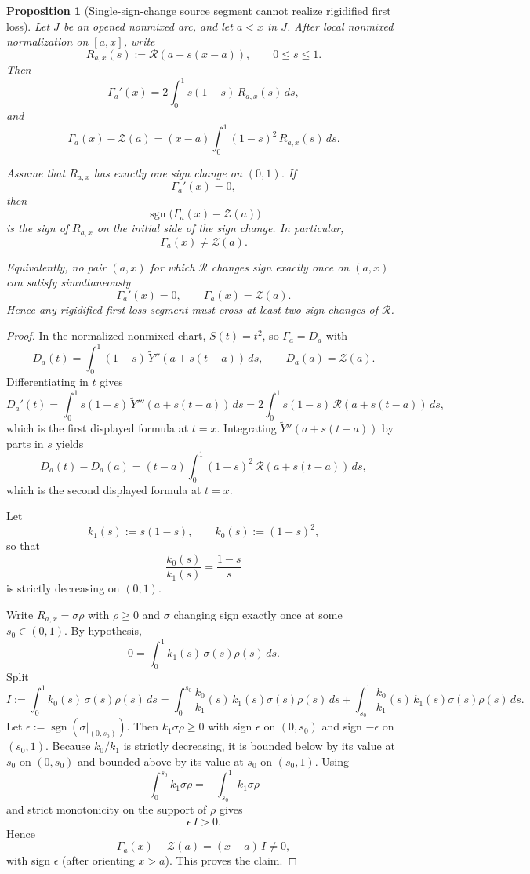 \documentclass[11pt,a4paper]{amsart}
\theoremstyle{plain}
\newtheorem{proposition}[theorem]{Proposition}
\theoremstyle{definition}
\begin{document}
\begin{proposition}[Single-sign-change source segment cannot realize rigidified first loss]
\label{prop:single-sign-change-cannot-realize-first-loss}
Let $J$ be an opened nonmixed arc, and let $a<x$ in $J$.
After local nonmixed normalization on $[a,x]$, write
\[
R_{a,x}(s):=\mathcal R(a+s(x-a)),
\qquad 0\le s\le 1.
\]
Then
\[
\Gamma_a'(x)
=
2\int_0^1 s(1-s)\,R_{a,x}(s)\,ds,
\]
and
\[
\Gamma_a(x)-\mathcal Z(a)
=
(x-a)\int_0^1 (1-s)^2\,R_{a,x}(s)\,ds.
\]

Assume that $R_{a,x}$ has exactly one sign change on $(0,1)$.
If
\[
\Gamma_a'(x)=0,
\]
then
\[
\operatorname{sgn}\bigl(\Gamma_a(x)-\mathcal Z(a)\bigr)
\]
is the sign of $R_{a,x}$ on the initial side of the sign change.
In particular,
\[
\Gamma_a(x)\neq \mathcal Z(a).
\]

Equivalently, no pair $(a,x)$ for which $\mathcal R$ changes sign exactly once
on $(a,x)$ can satisfy simultaneously
\[
\Gamma_a'(x)=0,
\qquad
\Gamma_a(x)=\mathcal Z(a).
\]
Hence any rigidified first-loss segment must cross at least two sign changes of
$\mathcal R$.
\end{proposition}

\begin{proof}
In the normalized nonmixed chart, $S(t)=t^2$, so
$\Gamma_a = D_a$ with
\[
D_a(t)=\int_0^1 (1-s)\,\widetilde Y''(a+s(t-a))\,ds,
\qquad
D_a(a)=\mathcal Z(a).
\]
Differentiating in $t$ gives
\[
D_a'(t)=\int_0^1 s(1-s)\,\widetilde Y'''(a+s(t-a))\,ds
=2\int_0^1 s(1-s)\,\mathcal R(a+s(t-a))\,ds,
\]
which is the first displayed formula at $t=x$. Integrating
$\widetilde Y''(a+s(t-a))$ by parts in $s$ yields
\[
D_a(t)-D_a(a)
=
(t-a)\int_0^1 (1-s)^2\,\mathcal R(a+s(t-a))\,ds,
\]
which is the second displayed formula at $t=x$.

Let
\[
k_1(s):=s(1-s),\qquad k_0(s):=(1-s)^2,
\]
so that
\[
\frac{k_0(s)}{k_1(s)}=\frac{1-s}{s}
\]
is strictly decreasing on $(0,1)$.

Write $R_{a,x}=\sigma\rho$ with $\rho\ge 0$ and $\sigma$ changing sign exactly
once at some $s_0\in(0,1)$. By hypothesis,
\[
0=\int_0^1 k_1(s)\,\sigma(s)\rho(s)\,ds.
\]
Split
\[
I:=\int_0^1 k_0(s)\,\sigma(s)\rho(s)\,ds
=
\int_0^{s_0}\frac{k_0}{k_1}(s)\,k_1(s)\sigma(s)\rho(s)\,ds
+
\int_{s_0}^1\frac{k_0}{k_1}(s)\,k_1(s)\sigma(s)\rho(s)\,ds.
\]
Let $\epsilon:=\operatorname{sgn}(\sigma|_{(0,s_0)})$. Then
$k_1\sigma\rho\ge 0$ with sign $\epsilon$ on $(0,s_0)$ and sign $-\epsilon$ on
$(s_0,1)$. Because $k_0/k_1$ is strictly decreasing, it is bounded below by
its value at $s_0$ on $(0,s_0)$ and bounded above by its value at $s_0$ on
$(s_0,1)$. Using
\[
\int_0^{s_0}k_1\sigma\rho=-\int_{s_0}^1 k_1\sigma\rho
\]
and strict monotonicity on the support of $\rho$ gives
\[
\epsilon\,I>0.
\]
Hence
\[
\Gamma_a(x)-\mathcal Z(a)=(x-a)\,I\neq 0,
\]
with sign $\epsilon$ (after orienting $x>a$). This proves the claim.
\end{proof}
\end{document}

